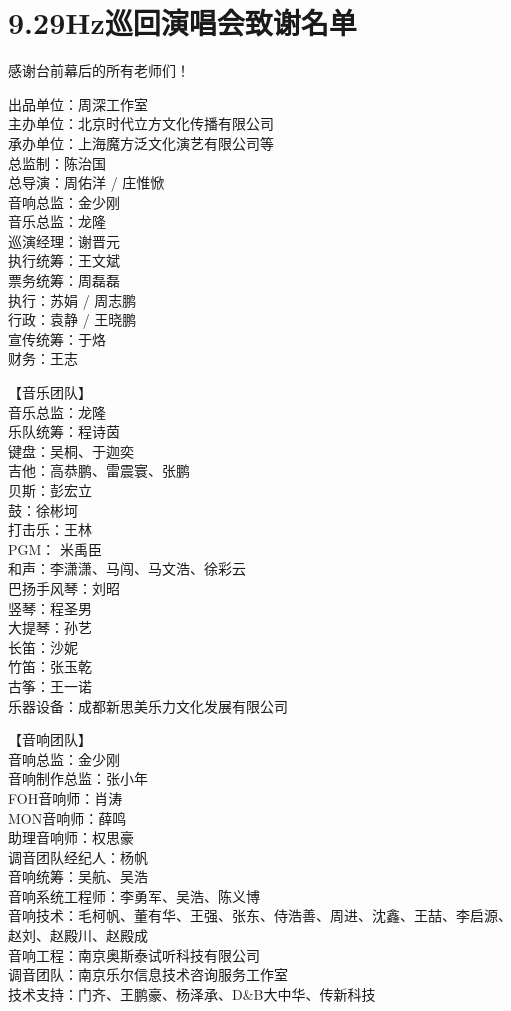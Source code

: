 \documentclass[]{ctexbook}
\begin{document}
\chapter{9.29Hz巡回演唱会致谢名单}\label{acknowledgements-list}

感谢台前幕后的所有老师们！

出品单位：周深工作室\\
主办单位：北京时代立方文化传播有限公司\\
承办单位：上海魔方泛文化演艺有限公司等\\
总监制：陈治国\\
总导演：周佑洋 / 庄惟惞\\
音响总监：金少刚\\
音乐总监：龙隆\\
巡演经理：谢晋元\\
执行统筹：王文斌\\
票务统筹：周磊磊\\
执行：苏娟 / 周志鹏\\
行政：袁静 / 王晓鹏\\
宣传统筹：于烙\\
财务：王志

【音乐团队】\\
音乐总监：龙隆\\
乐队统筹：程诗茵\\
键盘：吴桐、于迦奕\\
吉他：高恭鹏、雷震寰、张鹏\\
贝斯：彭宏立\\
鼓：徐彬坷\\
打击乐：王林\\
PGM： 米禹臣\\
和声：李潇潇、马闯、马文浩、徐彩云\\
巴扬手风琴：刘昭\\
竖琴：程圣男\\
大提琴：孙艺\\
长笛：沙妮\\
竹笛：张玉乾\\
古筝：王一诺\\
乐器设备：成都新思美乐力文化发展有限公司

【音响团队】\\
音响总监：金少刚\\
音响制作总监：张小年\\
FOH音响师：肖涛\\
MON音响师：薛鸣\\
助理音响师：权思豪\\
调音团队经纪人：杨帆\\
音响统筹：吴航、吴浩\\
音响系统工程师：李勇军、吴浩、陈义博\\
音响技术：毛柯帆、董有华、王强、张东、侍浩善、周进、沈鑫、王喆、李启源、赵刘、赵殿川、赵殿成\\
音响工程：南京奥斯泰试听科技有限公司\\
调音团队：南京乐尔信息技术咨询服务工作室\\
技术支持：门齐、王鹏豪、杨泽承、D\&B大中华、传新科技
\end{document}
